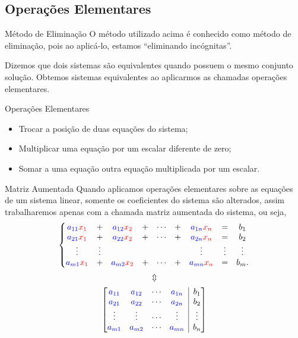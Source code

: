 \subsection*{Operações Elementares}
\begin{frame}[label=sistemas]{Método de Eliminação}
O método utilizado acima é conhecido como {\color{blue} método de eliminação}, pois ao aplicá-lo, estamos ``eliminando incógnitas''.
\medskip

Dizemos que dois sistemas são {\color{blue}equivalentes} quando possuem  o mesmo conjunto solução. Obtemos sistemas equivalentes ao aplicarmos as chamadas {\color{blue} operações elementares}.

\begin{block}{Operações Elementares}
\begin{itemize}
\item Trocar a posição de duas equações do sistema;
\item Multiplicar uma equação por um escalar diferente de zero;
\item Somar a uma equação outra equação multiplicada por um escalar.
\end{itemize}
\end{block}


\end{frame}

\begin{frame}[label=sistemas]{Matriz Aumentada}
Quando aplicamos {\color{blue} operações elementares} sobre as equações de um sistema linear, somente os coeficientes do sistema são alterados, assim  trabalharemos apenas com a chamada {\color{blue}matriz aumentada} do sistema, ou seja,
\[
\left\{\begin{matrix}
 {\color{blue}a_{11}}{\color{red}x_1} & + &  {\color{blue}a_{12}}{\color{red}x_2} & + & \cdots & + & {\color{blue}a_{1n}}{\color{red}x_n} & = & b_1  \\
 {\color{blue}a_{21}}{\color{red}x_1} & + & {\color{blue}a_{22}}{\color{red}x_2} & + &   \cdots & + & {\color{blue}a_{2n}}{\color{red}x_n} & = & b_2  \\
\vdots & \vdots  & & & &  & \vdots & \vdots & \vdots  \\
 {\color{blue}a_{m1}}{\color{red}x_1} & + & {\color{blue}a_{m2}}{\color{red}x_2} & + &  \cdots  & + &   {\color{blue}a_{mn}}{\color{red}x_n} & = & b_m. 
\end{matrix}
\right.
\]
\[\Updownarrow \]
\[
\left[\begin{array}{@{}cccc|c@{}}
  {\color{blue}a_{11}}  &  {\color{blue}a_{12}}  & \cdots &  {\color{blue}a_{1n}} & b_1  \\
  {\color{blue}a_{21}} & {\color{blue}a_{22}}  & \cdots  &  {\color{blue}a_{2n}} & b_2\\
 \vdots & \vdots & \cdots & \vdots & \vdots\\
 {\color{blue}a_{m1}} &  {\color{blue}a_{m2}}  & \cdots  &  {\color{blue}a_{mn}} & b_n
\end{array}\right]
\]
\end{frame}



